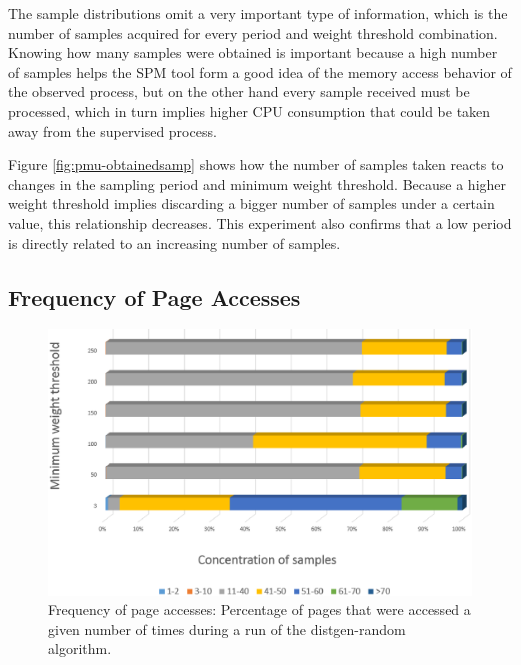 The sample distributions omit a very important type of information, which is the number of samples acquired for every period and weight threshold combination. Knowing how many samples were obtained is important because a high number of samples helps the SPM tool form a good idea of the memory access behavior of the observed process, but on the other hand every sample received must be processed, which in turn implies higher CPU consumption that could be taken away from the supervised process. 

Figure \ref{fig:pmu-obtainedsamp} shows how the number of samples taken reacts to changes in the sampling period and minimum weight threshold. Because a higher weight threshold implies discarding a bigger number of samples under a certain value, this relationship decreases. This experiment also confirms that a low period is directly related to an increasing number of samples.

\subsection{Frequency of Page Accesses}\label{subsection:pmu-freqpgacc}

\begin{figure}[th]
	\centering
		\includegraphics[width=.8\textwidth]{figures/pagetouch-dgenrdm.eps}
		\caption{Frequency of page accesses: Percentage of pages that were accessed a given number of times during a run of the distgen-random algorithm.}
		\label{fig:pmu-concentsamp-dgenrdm}
\end{figure}

